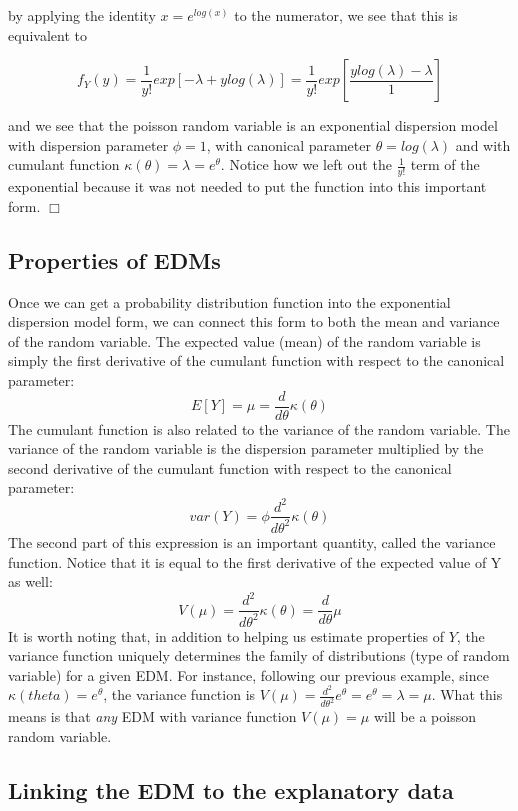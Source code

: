 \documentclass[
]{book}
\begin{document}
by applying the identity \(x=e^{log(x)}\) to the numerator, we see that this is equivalent to

\[
f_Y(y) =\frac{1}{y!} exp\left[-\lambda + y log(\lambda) \right] 
= \frac{1}{y!} exp\left[\frac{y log(\lambda) -\lambda}{1} \right] 
\]

and we see that the poisson random variable is an exponential dispersion model with dispersion parameter \(\phi = 1\), with canonical parameter \(\theta = log(\lambda)\) and with cumulant function \(\kappa(\theta) = \lambda = e^\theta\). Notice how we left out the \(\frac{1}{y!}\) term of the exponential because it was not needed to put the function into this important form. \(\Box\)

\hypertarget{properties-of-edms}{%
\subsection{Properties of EDMs}\label{properties-of-edms}}

Once we can get a probability distribution function into the exponential dispersion model form, we can connect this form to both the mean and variance of the random variable. The expected value (mean) of the random variable is simply the first derivative of the cumulant function with respect to the canonical parameter:
\[
E[Y] =\mu= \frac{d}{d\theta}\kappa(\theta)
\]
The cumulant function is also related to the variance of the random variable. The variance of the random variable is the dispersion parameter multiplied by the second derivative of the cumulant function with respect to the canonical parameter:
\[
var(Y) = \phi \frac{d^2}{d\theta^2} \kappa(\theta)
\]
The second part of this expression is an important quantity, called the variance function. Notice that it is equal to the first derivative of the expected value of Y as well:
\[
V(\mu) = \frac{d^2}{d\theta^2} \kappa(\theta) = \frac{d}{d\theta}\mu
\]
It is worth noting that, in addition to helping us estimate properties of \(Y\), the variance function uniquely determines the family of distributions (type of random variable) for a given EDM. For instance, following our previous example, since \(\kappa(theta) = e^{\theta}\), the variance function is \(V(\mu) = \frac{d^2}{d\theta^2} e^\theta = e^\theta = \lambda = \mu\). What this means is that \emph{any} EDM with variance function \(V(\mu) = \mu\) will be a poisson random variable.

\hypertarget{linking-the-edm-to-the-explanatory-data}{%
\subsection{Linking the EDM to the explanatory data}\label{linking-the-edm-to-the-explanatory-data}}
\end{document}

